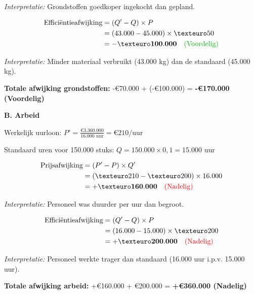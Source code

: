 \documentclass[a4paper,11pt]{article}
\begin{document}
\begin{oefenblok}
    \textit{Interpretatie:} Grondstoffen goedkoper ingekocht dan gepland.

    \begin{align*}
        \text{Efficiëntieafwijking} & = (Q' - Q) \times P                                                       \\
                                    & = (43.000 - 45.000) \times €50                                            \\
                                    & = \mathbf{-€100.000} \quad \text{\textcolor{green!70!black}{(Voordelig)}}
    \end{align*}

    \textit{Interpretatie:} Minder materiaal verbruikt (43.000 kg) dan de standaard (45.000 kg).

    \textbf{Totale afwijking grondstoffen:} -€70.000 + (-€100.000) = \textbf{-€170.000 (Voordelig)}

    \textbf{B. Arbeid}

    Werkelijk uurloon: $P' = \frac{€3.360.000}{16.000\text{ uur}} = €210/\text{uur}$

    Standaard uren voor 150.000 stuks: $Q = 150.000 \times 0,1 = 15.000$ uur

    \begin{align*}
        \text{Prijsafwijking} & = (P' - P) \times Q'                                         \\
                              & = (€210 - €200) \times 16.000                                \\
                              & = \mathbf{+€160.000} \quad \text{\textcolor{red}{(Nadelig)}}
    \end{align*}

    \textit{Interpretatie:} Personeel was duurder per uur dan begroot.

    \begin{align*}
        \text{Efficiëntieafwijking} & = (Q' - Q) \times P                                          \\
                                    & = (16.000 - 15.000) \times €200                              \\
                                    & = \mathbf{+€200.000} \quad \text{\textcolor{red}{(Nadelig)}}
    \end{align*}

    \textit{Interpretatie:} Personeel werkte trager dan standaard (16.000 uur i.p.v. 15.000 uur).

    \textbf{Totale afwijking arbeid:} +€160.000 + €200.000 = \textbf{+€360.000 (Nadelig)}


\end{oefenblok}
\end{document}
